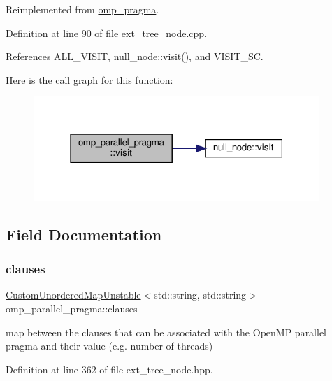 Reimplemented from \hyperlink{structomp__pragma_a2e2c445528b7e097ae76fa618a9970b5}{omp\+\_\+pragma}.



Definition at line 90 of file ext\+\_\+tree\+\_\+node.\+cpp.



References A\+L\+L\+\_\+\+V\+I\+S\+IT, null\+\_\+node\+::visit(), and V\+I\+S\+I\+T\+\_\+\+SC.

Here is the call graph for this function\+:
\nopagebreak
\begin{figure}[H]
\begin{center}
\leavevmode
\includegraphics[width=307pt]{dd/dfb/structomp__parallel__pragma_ac501a81fc5120b8ce8ec7c75fb617b57_cgraph}
\end{center}
\end{figure}


\subsection{Field Documentation}
\mbox{\label{structomp__parallel__pragma_a4befddd57ba7cd852517221c4695720c}} 
\subsubsection{\texorpdfstring{clauses}{clauses}}
{\footnotesize\ttfamily \hyperlink{custom__map_8hpp_a8cbaceffc09790a885ec7e9c17809c69}{Custom\+Unordered\+Map\+Unstable}$<$std\+::string, std\+::string$>$ omp\+\_\+parallel\+\_\+pragma\+::clauses}



map between the clauses that can be associated with the Open\+MP parallel pragma and their value (e.\+g. number of threads) 



Definition at line 362 of file ext\+\_\+tree\+\_\+node.\+hpp.

